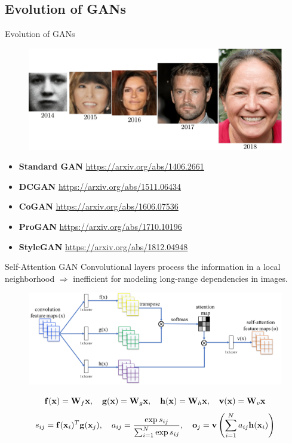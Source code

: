 \subsection{Evolution of GANs}
\begin{frame}{Evolution of GANs}
	\begin{figure}
		\centering
		\includegraphics[width=\linewidth]{figs/gan_evolution}
	\end{figure}
	\begin{itemize}
		\item \textbf{Standard GAN} \href{https://arxiv.org/abs/1406.2661}{https://arxiv.org/abs/1406.2661}
		\item \textbf{DCGAN} \href{https://arxiv.org/abs/1511.06434}{https://arxiv.org/abs/1511.06434}
		\item \textbf{CoGAN} \href{https://arxiv.org/abs/1606.07536}{https://arxiv.org/abs/1606.07536}
		\item \textbf{ProGAN} \href{https://arxiv.org/abs/1710.10196}{https://arxiv.org/abs/1710.10196} 
		\item \textbf{StyleGAN} \href{https://arxiv.org/abs/1812.04948}{https://arxiv.org/abs/1812.04948}
	\end{itemize}
\end{frame}
\begin{frame}{Self-Attention GAN}
	Convolutional layers process the information in a local neighborhood $\Rightarrow$ inefficient for modeling long-range dependencies in images.
	\vspace{-0.3cm}
	\begin{figure}
		\centering
		\includegraphics[width=0.9\linewidth]{figs/self-attention}
	\end{figure}
	\[
	\mathbf{f}(\mathbf{x}) = \mathbf{W}_f \mathbf{x}, \quad \mathbf{g}(\mathbf{x}) = \mathbf{W}_g\mathbf{x}, \quad \mathbf{h} (\mathbf{x}) = \mathbf{W}_h\mathbf{x}, \quad \mathbf{v}(\mathbf{x}) = \mathbf{W}_v\mathbf{x}
	\]
	\[
	s_{ij} = \mathbf{f}(\mathbf{x}_i)^T \mathbf{g}(\mathbf{x}_j), \quad a_{ij} = \frac{\exp{s_{ij}}}{\sum_{i=1}^N \exp{s_{ij}}}, \quad \textbf{o}_j = \textbf{v}\left( \sum_{i=1}^N a_{ij} \mathbf{h}(\mathbf{x}_i) \right)
	\]
\end{frame}
